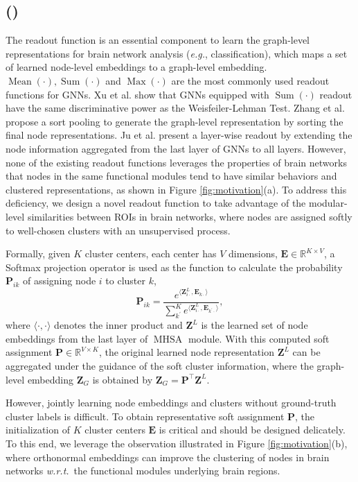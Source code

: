 \subsection{\pooling (\poolingshort)}

The readout function is an essential component to learn the graph-level representations for brain network analysis (\textit{e.g.}, classification), which maps a set of learned node-level embeddings to a graph-level embedding. $\operatorname{Mean}(\cdot), \operatorname{Sum}(\cdot)$ and $\operatorname{Max}(\cdot)$ are the most commonly used readout functions for GNNs. Xu et al. \citep{xu_sum} show that GNNs equipped with $\operatorname{Sum}(\cdot)$ readout have the same discriminative power as the Weisfeiler-Lehman Test. Zhang et al. \citep{zhang2018end} propose a sort pooling to generate the graph-level representation by sorting the final node representations. Ju et al. \citep{liangzhao} present a layer-wise readout by extending the node information aggregated from the last layer of GNNs to all layers. However, none of the existing readout functions leverages the properties of brain networks that nodes in the same functional modules tend to have similar behaviors and clustered representations, as shown in Figure \ref{fig:motivation}(a). To address this deficiency, we design a novel readout function to take advantage of the modular-level similarities between ROIs in brain networks, where nodes are assigned softly to well-chosen clusters with an unsupervised process. 

Formally, given $K$ cluster centers, each center has $V$ dimensions, $\bm E\in \mathbb{R}^{K \times V }$, a Softmax projection operator is used as the function to calculate the probability $\bm P_{ik}$ of assigning node $i$ to cluster $k$, 
\begin{equation}
\label{equ:project}
\bm P_{ik} =\frac{e^{\langle \bm Z_{i\cdot}^L, \bm E_{k\cdot}\rangle} }{\sum_{k^{\prime}}^K e^{\langle \bm Z_{i\cdot}^L, \bm E_{k^{\prime}\cdot}\rangle}}, 
\end{equation}
where $\langle \cdot, \cdot\rangle$ denotes the inner product and $\bm Z^L$ is the learned set of node embeddings from the last layer of $\operatorname{MHSA}$ module. With this computed soft assignment $\bm P\in \mathbb{R}^{V \times K }$, the original learned node representation $\bm Z^L$ can be aggregated under the guidance of the soft cluster information, where the graph-level embedding $\bm Z_G$ is obtained by $\bm Z_G=\bm P^\top \bm Z^L$.

However, jointly learning node embeddings and clusters without ground-truth cluster labels is difficult. To obtain representative soft assignment $\bm P$, the initialization of $K$ cluster centers $\bm E$ is critical and should be designed delicately. To this end, we leverage the observation illustrated in Figure \ref{fig:motivation}(b), where orthonormal embeddings can improve the clustering of nodes in brain networks \textit{w.r.t.}~the functional modules underlying brain regions.


